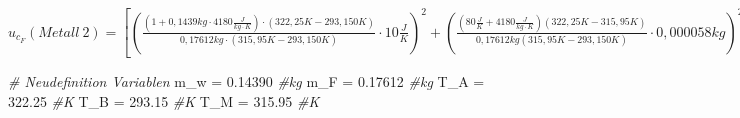 \documentclass[class=article, crop=false]{standalone}
\newenvironment{Shaded}{\begin{snugshade}}{\end{snugshade}}
\newcommand{\CommentTok}[1]{\textcolor[rgb]{0.56,0.35,0.01}{\textit{#1}}}
\newcommand{\FloatTok}[1]{\textcolor[rgb]{0.00,0.00,0.81}{#1}}
\newcommand{\NormalTok}[1]{#1}
\newcommand{\OtherTok}[1]{\textcolor[rgb]{0.56,0.35,0.01}{#1}}
\begin{document}
\(u_{c_F}(Metall\ 2)=[(\frac{(1+0,1439kg\cdot 4180\frac{J}{kg\cdot K})\cdot (322,25K-293,150K)}{0,17612kg\cdot (315,95K-293,150K)}\cdot 10\frac{J}{K})^2+(\frac{(80\frac{J}{K}+4180\frac{J}{kg\cdot K})(322,25K-315,95K)}{0,17612kg (315,95K-293,150K)}\cdot 0,000058kg)^2+(\frac{(80\frac{J}{K}+0,1439kg\cdot 4180\frac{J}{kg\cdot K})\cdot (322,25K-1)}{0,17612kg(1-293,150K)}\cdot 0,029K)^2+(\frac{(80\frac{J}{K}+0,1439kg\cdot 4180\frac{J}{kg\cdot K})\cdot (322,25K-315,95K)}{0,17612kg (315,95K-1)}\cdot 0,029K)^2+(\frac{(80\frac{J}{K}+0,1439kg\cdot 4180\frac{J}{kg\cdot K})\cdot (322,25K-315,95K)}{315,95K-293,150K}\cdot 0,000029kg)^2+(\frac{(80\frac{J}{K}+0,1439kg\cdot 4180\frac{J}{kg\cdot K})\cdot (1-315,95K) }{0,17612kg(315,95K-293,150K)}\cdot 0,029K)^2]^{\frac{1}{2}} \approx 9600 \frac{J}{kg \cdot K}\)

\begin{Shaded}
\begin{Highlighting}[]
\CommentTok{\# Neudefinition Variablen}
\NormalTok{m\_w }\OtherTok{=} \FloatTok{0.14390} \CommentTok{\#kg}
\NormalTok{m\_F }\OtherTok{=} \FloatTok{0.17612} \CommentTok{\#kg}
\NormalTok{T\_A }\OtherTok{=} \FloatTok{322.25} \CommentTok{\#K}
\NormalTok{T\_B }\OtherTok{=} \FloatTok{293.15} \CommentTok{\#K}
\NormalTok{T\_M }\OtherTok{=} \FloatTok{315.95} \CommentTok{\#K}


\end{Highlighting}
\end{Shaded}
\end{document}

